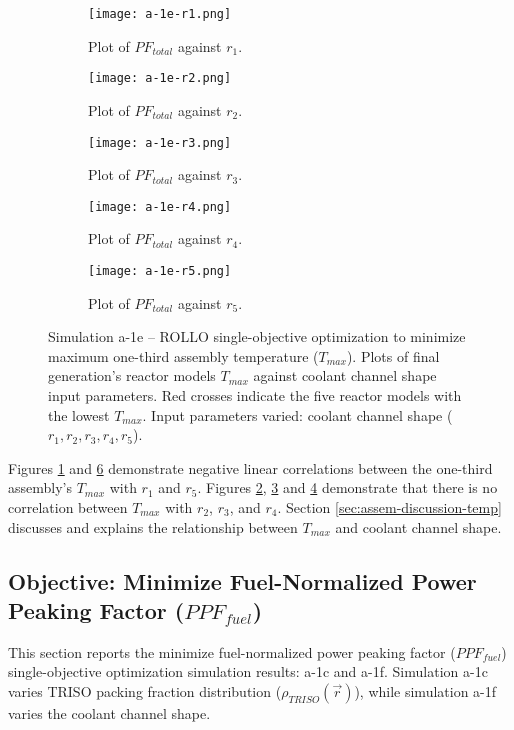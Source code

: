 \begin{figure}[htbp!]
    \ContinuedFloat
    \centering
    \begin{subfigure}{0.49\textwidth}
        \texttt{[image: a-1e-r1.png]}
        \caption{Plot of $PF_{total}$ against $r_1$.}
        \label{fig:a-1e-r1} 
    \end{subfigure}
    \begin{subfigure}{0.49\textwidth}
        \texttt{[image: a-1e-r2.png]}
        \caption{Plot of $PF_{total}$ against $r_2$.}
        \label{fig:a-1e-r2} 
    \end{subfigure}
    \begin{subfigure}{0.49\textwidth}
        \texttt{[image: a-1e-r3.png]}
        \caption{Plot of $PF_{total}$ against $r_3$.}
        \label{fig:a-1e-r3} 
    \end{subfigure}
    \begin{subfigure}{0.49\textwidth}
        \texttt{[image: a-1e-r4.png]}
        \caption{Plot of $PF_{total}$ against $r_4$.}
        \label{fig:a-1e-r4} 
    \end{subfigure}
    \begin{subfigure}{0.49\textwidth}
        \texttt{[image: a-1e-r5.png]}
        \caption{Plot of $PF_{total}$ against $r_5$.}
        \label{fig:a-1e-r5} 
    \end{subfigure}
    \caption{Simulation a-1e -- ROLLO single-objective optimization to minimize 
    maximum one-third assembly temperature ($T_{max}$). 
    Plots of final generation's reactor models $T_{max}$ against 
    coolant channel shape input parameters. 
    Red crosses indicate the five reactor models with the lowest $T_{max}$.
    Input parameters varied: coolant channel shape ($r_1, r_2, r_3, r_4, r_5$).}
\end{figure}

Figures \ref{fig:a-1e-r1} and \ref{fig:a-1e-r5} demonstrate negative linear correlations 
between the one-third assembly's $T_{max}$ with $r_1$ and $r_5$. 
Figures \ref{fig:a-1e-r2}, \ref{fig:a-1e-r3} and \ref{fig:a-1e-r4} demonstrate that 
there is no correlation between $T_{max}$ with $r_2$, $r_3$, and $r_4$. 
Section \ref{sec:assem-discussion-temp} discusses and explains the relationship between 
$T_{max}$ and coolant channel shape. 

\subsection{Objective: Minimize Fuel-Normalized Power Peaking Factor ($PPF_{fuel}$)}
\label{sec:assem-1-obj-ppf}
This section reports the minimize fuel-normalized power peaking factor 
($PPF_{fuel}$) single-objective optimization simulation results: a-1c and a-1f. 
Simulation a-1c varies \gls{TRISO} packing fraction distribution 
($\rho_{TRISO}(\vec{r})$), while simulation a-1f varies the coolant channel shape.

